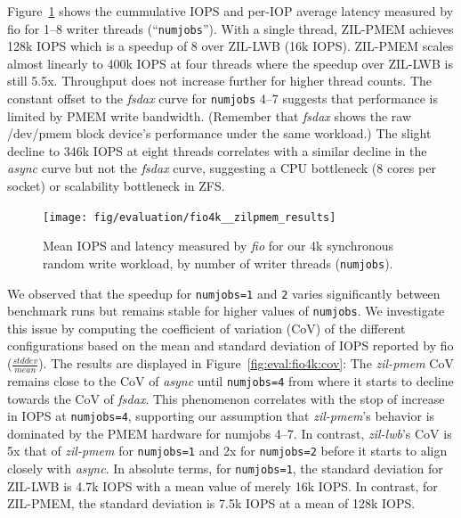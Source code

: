 \documentclass[12pt,a4paper,twoside]{book}
\begin{document}
Figure~\ref{fig:eval:fio4k:metrics} shows the cummulative IOPS and per-IOP average latency measured by fio for 1--8 writer threads (``\lstinline{numjobs}'').
With a single thread, ZIL-PMEM achieves 128k IOPS which is a speedup of 8 over ZIL-LWB (16k IOPS).
ZIL-PMEM scales almost linearly to 400k IOPS at four threads where the speedup over ZIL-LWB is still 5.5x.
Throughput does not increase further for higher thread counts.
The constant offset to the \textit{fsdax} curve for \lstinline{numjobs} 4--7 suggests that performance is limited by PMEM write bandwidth.
(Remember that \textit{fsdax} shows the raw /dev/pmem block device's performance under the same workload.)
The slight decline to 346k IOPS at eight threads correlates with a similar decline in the \textit{async} curve but not the \textit{fsdax} curve, suggesting a CPU bottleneck (8 cores per socket) or scalability bottleneck in ZFS.

\begin{figure}[H]
    \centering
    \texttt{[image: fig/evaluation/fio4k\_\_zilpmem\_results]}
    \caption{Mean IOPS and latency measured by \textit{fio} for our 4k synchronous random write workload, by number of writer threads (\lstinline{numjobs}).}
    \label{fig:eval:fio4k:metrics}
\end{figure}

We observed that the speedup for \lstinline{numjobs=1} and \lstinline{2} varies significantly between benchmark runs but remains stable for higher values of \lstinline{numjobs}.
We investigate this issue by computing the coefficient of variation (CoV) of the different configurations based on the mean and standard deviation of IOPS reported by fio ($\frac{stddev}{mean}$).
The results are displayed in Figure~\ref{fig:eval:fio4k:cov}:
The \textit{zil-pmem} CoV remains close to the CoV of \textit{async} until \lstinline{numjobs=4} from where it starts to decline towards the CoV of \textit{fsdax}.
This phenomenon correlates with the stop of increase in IOPS at \lstinline{numjobs=4}, supporting our assumption that \textit{zil-pmem}'s behavior is dominated by the PMEM hardware for numjobs 4--7.
In contrast, \textit{zil-lwb}'s CoV is 5x that of \textit{zil-pmem} for \lstinline{numjobs=1} and 2x for \lstinline{numjobs=2} before it starts to align closely with \textit{async}.
In absolute terms, for \lstinline{numjobs=1}, the standard deviation for ZIL-LWB is 4.7k IOPS with a mean value of merely 16k IOPS.
In contrast, for ZIL-PMEM, the standard deviation is 7.5k IOPS at a mean of 128k IOPS.
\end{document}
